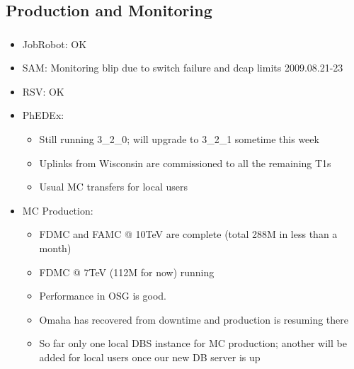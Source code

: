 \documentclass{beamer}
\begin{document}
\subsection{Production and Monitoring}
\begin{frame}
\frametitle{}
\begin{itemize}
	\item JobRobot: OK
	\item SAM: Monitoring blip due to switch failure and dcap limits 2009.08.21-23
	\item RSV: OK
	\item PhEDEx:
	\begin{itemize}
		\item Still running 3\_2\_0; will upgrade to 3\_2\_1 sometime this week
		\item Uplinks from Wisconsin are commissioned to all the remaining T1s
		\item Usual MC transfers for local users
	\end{itemize}
	\item MC Production:
	\begin{itemize}
		\item FDMC and FAMC @ 10TeV are complete (total 288M in less than a month)
		\item FDMC @ 7TeV (112M for now) running
		\item Performance in OSG is good.
		\item Omaha has recovered from downtime and production is resuming there
		\item So far only one local DBS instance for MC production; another will be added for local users once our new DB server is up
	\end{itemize}
\end{itemize}
\end{frame}
\end{document}
